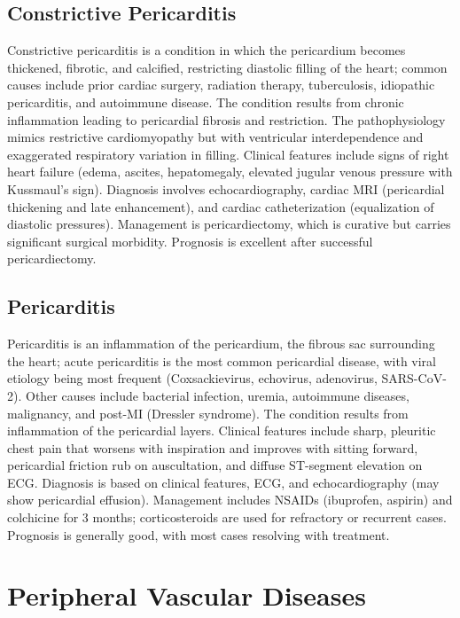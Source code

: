 \subsection{Constrictive Pericarditis}
\label{sec:Constrictive Pericarditis}
Constrictive pericarditis is a condition in which the pericardium becomes thickened, fibrotic, and calcified, restricting diastolic filling of the heart; common causes include prior cardiac surgery, radiation therapy, tuberculosis, idiopathic pericarditis, and autoimmune disease. The condition results from chronic inflammation leading to pericardial fibrosis and restriction. The pathophysiology mimics restrictive cardiomyopathy but with ventricular interdependence and exaggerated respiratory variation in filling. Clinical features include signs of right heart failure (edema, ascites, hepatomegaly, elevated jugular venous pressure with Kussmaul's sign). Diagnosis involves echocardiography, cardiac MRI (pericardial thickening and late enhancement), and cardiac catheterization (equalization of diastolic pressures). Management is pericardiectomy, which is curative but carries significant surgical morbidity. Prognosis is excellent after successful pericardiectomy.

\subsection{Pericarditis}
\label{sec:Pericarditis}
Pericarditis is an inflammation of the pericardium, the fibrous sac surrounding the heart; acute pericarditis is the most common pericardial disease, with viral etiology being most frequent (Coxsackievirus, echovirus, adenovirus, SARS-CoV-2). Other causes include bacterial infection, uremia, autoimmune diseases, malignancy, and post-MI (Dressler syndrome). The condition results from inflammation of the pericardial layers. Clinical features include sharp, pleuritic chest pain that worsens with inspiration and improves with sitting forward, pericardial friction rub on auscultation, and diffuse ST-segment elevation on ECG. Diagnosis is based on clinical features, ECG, and echocardiography (may show pericardial effusion). Management includes NSAIDs (ibuprofen, aspirin) and colchicine for 3 months; corticosteroids are used for refractory or recurrent cases. Prognosis is generally good, with most cases resolving with treatment.

\section{Peripheral Vascular Diseases}

